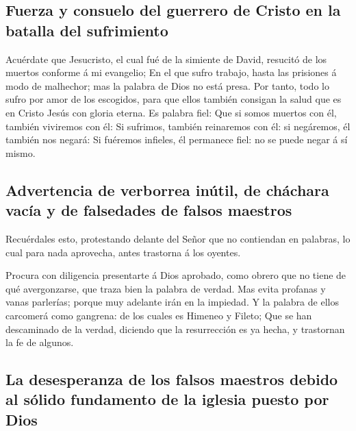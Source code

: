 \hypertarget{fuerza-y-consuelo-del-guerrero-de-cristo-en-la-batalla-del-sufrimiento}{%
\subsection{Fuerza y \hspace{0pt}\hspace{0pt}consuelo del guerrero de
Cristo en la batalla del
sufrimiento}\label{fuerza-y-consuelo-del-guerrero-de-cristo-en-la-batalla-del-sufrimiento}}

 Acuérdate que Jesucristo, el cual fué de la simiente de
David, resucitó de los muertos conforme á mi evangelio; 
En el que sufro trabajo, hasta las prisiones á modo de malhechor; mas la
palabra de Dios no está presa.  Por tanto, todo lo sufro
por amor de los escogidos, para que ellos también consigan la salud que
es en Cristo Jesús con gloria eterna.  Es palabra fiel:
Que si somos muertos con él, también viviremos con él: 
Si sufrimos, también reinaremos con él: si negáremos, él también nos
negará:  Si fuéremos infieles, él permanece fiel: no se
puede negar á sí mismo.

\hypertarget{advertencia-de-verborrea-inuxfatil-de-chuxe1chara-vacuxeda-y-de-falsedades-de-falsos-maestros}{%
\subsection{Advertencia de verborrea inútil, de cháchara vacía y de
falsedades de falsos
maestros}\label{advertencia-de-verborrea-inuxfatil-de-chuxe1chara-vacuxeda-y-de-falsedades-de-falsos-maestros}}

 Recuérdales esto, protestando delante del Señor que no
contiendan en palabras, lo cual para nada aprovecha, antes trastorna á
los oyentes.

 Procura con diligencia presentarte á Dios aprobado, como
obrero que no tiene de qué avergonzarse, que traza bien la palabra de
verdad.  Mas evita profanas y vanas parlerías; porque muy
adelante irán en la impiedad.  Y la palabra de ellos
carcomerá como gangrena: de los cuales es Himeneo y Fileto;
 Que se han descaminado de la verdad, diciendo que la
resurrección es ya hecha, y trastornan la fe de algunos.

\hypertarget{la-desesperanza-de-los-falsos-maestros-debido-al-suxf3lido-fundamento-de-la-iglesia-puesto-por-dios}{%
\subsection{La desesperanza de los falsos maestros debido al sólido
fundamento de la iglesia puesto por
Dios}\label{la-desesperanza-de-los-falsos-maestros-debido-al-suxf3lido-fundamento-de-la-iglesia-puesto-por-dios}}

